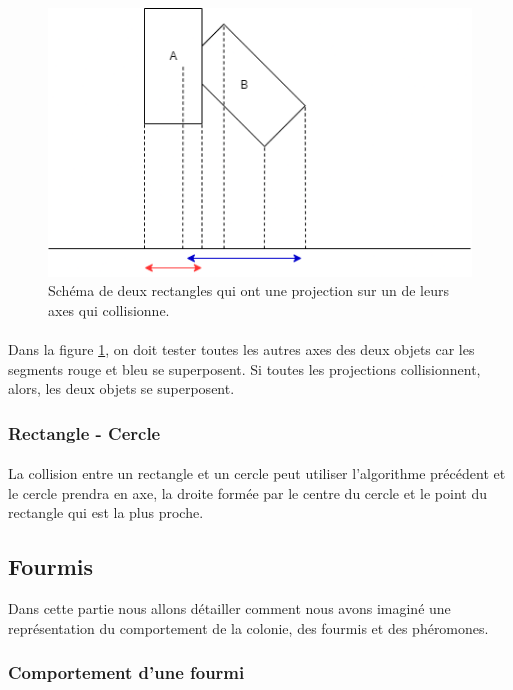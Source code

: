 \documentclass{EPUProjetDi}
\begin{document}
\begin{figure}[h]
    \centering
    \includegraphics[scale=0.6]{rectangle_collider_rectangle_2.png}
    \caption{Schéma de deux rectangles qui ont une projection sur un de leurs axes qui collisionne.}
    \label{fig:rectangle_collider_rectangle_2}
\end{figure}

\paragraph{}
Dans la figure \ref{fig:rectangle_collider_rectangle_2}, on doit tester toutes les autres axes des deux objets car les segments rouge et bleu se superposent.
Si toutes les projections collisionnent, alors, les deux objets se superposent.

\subsubsection*{Rectangle - Cercle}
\paragraph{}
La collision entre un rectangle et un cercle peut utiliser l'algorithme précédent et 
le cercle prendra en axe, la droite formée par le centre du cercle et le point du rectangle qui est la plus proche.

\subsection{Fourmis}

Dans cette partie nous allons détailler comment nous avons imaginé une représentation du comportement de la colonie, des fourmis et des phéromones.

\subsubsection{Comportement d'une fourmi}
\end{document}
